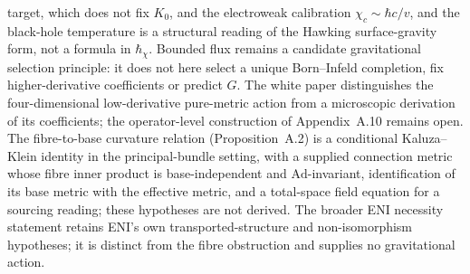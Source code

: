 \documentclass[11pt,a4paper]{article}
\begin{document}
    target, which does not fix $K_0$, and the electroweak calibration $\chi_c \sim \hbar c/v$, and the black-hole
    temperature is a structural reading of the Hawking
    surface-gravity form, not a formula in $\hbar_\chi$.
    Bounded flux remains a candidate gravitational selection principle: it does not here select a unique
    Born--Infeld completion, fix higher-derivative coefficients or predict $G$.
    The white paper distinguishes the four-dimensional low-derivative pure-metric action from a microscopic
    derivation of its coefficients; the operator-level construction of Appendix~A.10 remains open.
    The fibre-to-base curvature relation (Proposition~A.2) is a conditional Kaluza--Klein identity in the
    principal-bundle setting, with a supplied connection metric whose fibre inner product is base-independent
    and $\mathrm{Ad}$-invariant, identification of its base metric with the effective metric, and a total-space
    field equation for a sourcing reading; these hypotheses are not derived.
    The broader ENI necessity statement retains ENI's own transported-structure and non-isomorphism hypotheses;
    it is distinct from the fibre obstruction and supplies no gravitational action.
\end{document}

